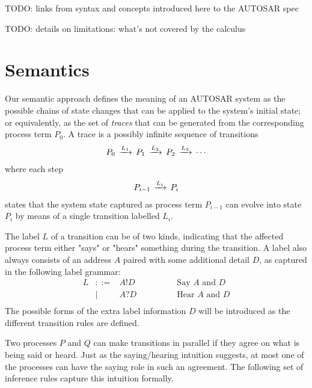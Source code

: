 \documentclass[twocolumn]{article}
\begin{document}
TODO: links from syntax and concepts introduced here to the AUTOSAR spec

TODO: details on limitations: what's not covered by the calculus

\section{Semantics}
\label{sec:Sem}

Our semantic approach defines the meaning of an AUTOSAR system as the possible chains of state changes that can be applied to the system's initial state; or equivalently, as the set of \emph{traces} that can be generated from the corresponding process term $P_0$. A trace is a possibly infinite sequence of transitions
\[
\begin{array}{c}
  P_0 \,\xrightarrow{L_1}\, P_1 \,\xrightarrow{L_2}\, P_2 \,\xrightarrow{L_3}\, \cdots
\end{array}
\]
where each step
\[
\begin{array}{c}
  P_{i-1} \,\xrightarrow{L_i}\, P_i
\end{array}
\]
states that the system state captured as process term $P_{i-1}$ can evolve into state $P_i$ by means of a single transition labelled $L_i$.


The label $L$ of a transition can be of two kinds, indicating that the affected process term either "says" or "hears" something during the transition. A label also always consists of an address $A$ paired with some additional detail $D$, as captured in the following label grammar:
\[
\begin{array}{rcll}
  L     & ::= & A!D & \hspace{4em}\text{Say  $A$ and $D$} \\
        & |   & A?D & \hspace{4em}\text{Hear $A$ and $D$} \\
\end{array}
\]
The possible forms of the extra label information $D$ will be introduced as the different transition rules are defined.

Two processes $P$ and $Q$ can make transitions in parallel if they agree on what is being said or heard. Just as the saying/hearing intuition suggests, at most one of the processes can have the saying role in such an agreement. The following set of inference rules capture this intuition formally.
\end{document}
